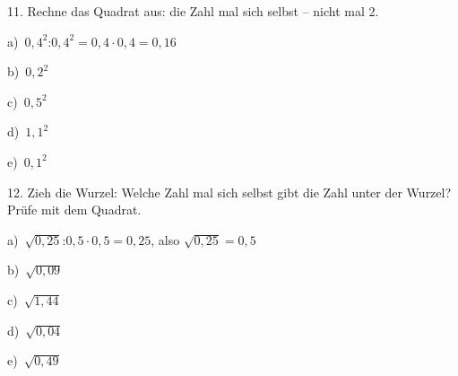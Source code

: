 \documentclass[11pt]{article}
\newcommand{\grau}[1]{{\color{mbgrau}#1}}
\begin{document}
\begin{pfaufg}{}{11.}{}
Rechne das Quadrat aus: die Zahl mal sich selbst – nicht mal 2.\par\smallskip
\grau{a)\ $0{,}4^2$:\quad $0{,}4^2 = 0{,}4 \cdot 0{,}4 = 0{,}16$}\par\medskip
\noindent\begin{minipage}[t]{0.48\linewidth}\raggedright
b)\ $0{,}2^2$
\end{minipage}\hfill
\begin{minipage}[t]{0.48\linewidth}\raggedright
c)\ $0{,}5^2$
\end{minipage}\par\smallskip
\noindent\begin{minipage}[t]{0.48\linewidth}\raggedright
d)\ $1{,}1^2$
\end{minipage}\hfill
\begin{minipage}[t]{0.48\linewidth}\raggedright
e)\ $0{,}1^2$
\end{minipage}\par\smallskip
{}
\end{pfaufg}

\begin{pfaufg}{}{12.}{}
Zieh die Wurzel: Welche Zahl mal sich selbst gibt die Zahl unter der Wurzel? Prüfe mit dem Quadrat.\par\smallskip
\grau{a)\ $\sqrt{0{,}25}$:\quad $0{,}5 \cdot 0{,}5 = 0{,}25$, also $\sqrt{0{,}25} = 0{,}5$}\par\medskip
\noindent\begin{minipage}[t]{0.48\linewidth}\raggedright
b)\ $\sqrt{0{,}09}$
\end{minipage}\hfill
\begin{minipage}[t]{0.48\linewidth}\raggedright
c)\ $\sqrt{1{,}44}$
\end{minipage}\par\smallskip
\noindent\begin{minipage}[t]{0.48\linewidth}\raggedright
d)\ $\sqrt{0{,}04}$
\end{minipage}\hfill
\begin{minipage}[t]{0.48\linewidth}\raggedright
e)\ $\sqrt{0{,}49}$
\end{minipage}\par\smallskip
{}
\end{pfaufg}
\end{document}
